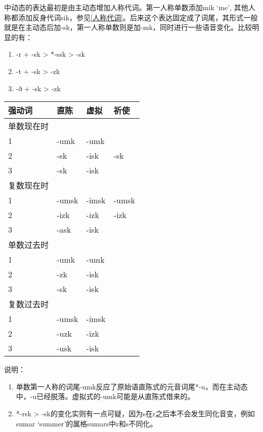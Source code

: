中动态的表达最初是由主动态增加人称代词。第一人称单数添加mik `me',
其他人称都添加反身代词sik，参见\ref{人称代词}。后来这个表达固定成了词尾，其形式一般就是在主动态后加-sk，第一人称单数则是加-mk，同时进行一些语音变化。比较明显的有：

\begin{enumerate}
    \item
          -r + -sk > *-ssk > -sk
    \item
          -t + -sk > -zk
    \item
          -ð + -sk > -zk
\end{enumerate}

\begin{longtable}{llll}
    \toprule
    强动词   & 直陈    & 虚拟    & 祈使    \\
    \midrule
    \endhead
    \bottomrule
    \endfoot
    单数现在时 &       &       &       \\
    1     & -umk  & -umk  &       \\
    2     & -sk   & -isk  & -sk   \\
    3     & -sk   & -isk  &       \\
    复数现在时 &       &       &       \\
    1     & -umsk & -imsk & -umsk \\
    2     & -izk  & -izk  & -izk  \\
    3     & -ask  & -isk  &       \\
    单数过去时 &       &       &       \\
    1     & -umk  & -umk  &       \\
    2     & -zk   & -isk  &       \\
    3     & -sk   & -isk  &       \\
    复数过去时 &       &       &       \\
    1     & -umsk & -imsk &       \\
    2     & -uzk  & -izk  &       \\
    3     & -usk  & -isk  &       \\
\end{longtable}

说明：

\begin{enumerate}
    \item
          单数第一人称的词尾-umk反应了原始语直陈式的元音词尾*-u，而在主动态中，-u已经脱落。虚拟式的-umk可能是从直陈式借来的。
    \item
          *-rsk > -sk的变化实则有一点可疑，因为s在r之后本不会发生同化音变，例如sumar `summer'的属格sumars中r和s不同化。
\end{enumerate}

